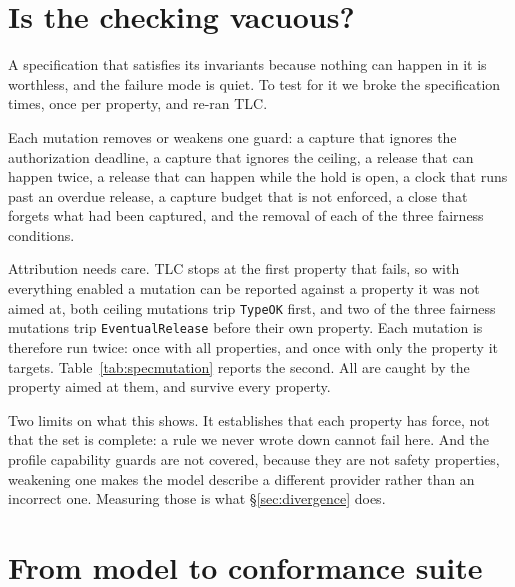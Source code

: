 \documentclass[conference]{IEEEtran}
\newcommand{\code}[1]{\texttt{\small #1}}
\begin{document}
\section{Is the checking vacuous?}
\label{sec:vacuity}

A specification that satisfies its invariants because nothing can happen in it
is worthless, and the failure mode is quiet. To test for it we broke the
specification \numspecmutations{} times, once per property, and re-ran TLC.

Each mutation removes or weakens one guard: a capture that ignores the
authorization deadline, a capture that ignores the ceiling, a release that can
happen twice, a release that can happen while the hold is open, a clock that
runs past an overdue release, a capture budget that is not enforced, a close that
forgets what had been captured, and the removal of each of the three fairness
conditions.

Attribution needs care. TLC stops at the first property that fails, so with
everything enabled a mutation can be reported against a property it was not
aimed at, both ceiling mutations trip \code{TypeOK} first, and two of the
three fairness mutations trip \code{EventualRelease} before their own property.
Each mutation is therefore run twice: once with all properties, and once with
only the property it targets. Table~\ref{tab:specmutation} reports the second.
All \specmutationscaught{} are caught by the property aimed at them, and
\specmutationssurvived{} survive every property.

Two limits on what this shows. It establishes that each property has force, not
that the set is complete: a rule we never wrote down cannot fail here. And the
profile capability guards are not covered, because they are not safety
properties, weakening one makes the model describe a different provider rather
than an incorrect one. Measuring those is what \S\ref{sec:divergence} does.

\begin{table}[t]
\centering
\caption{Specification mutations. ``Caught'' is with only the targeted property
enabled. Trace is the counterexample length TLC reported.}
\label{tab:specmutation}
\small

\end{table}

\section{From model to conformance suite}
\label{sec:conformance}
\end{document}
